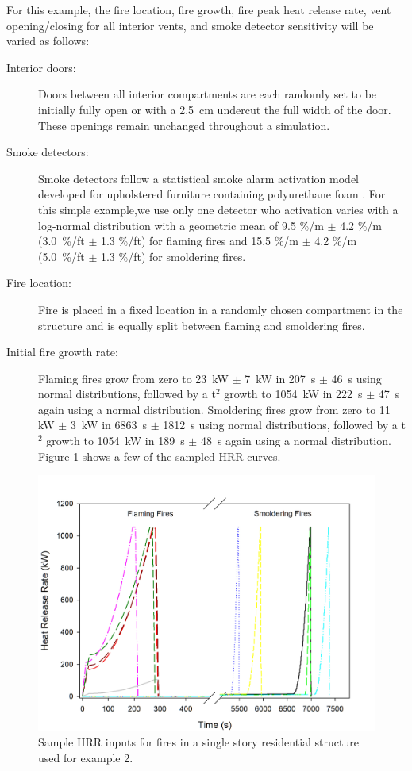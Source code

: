 \documentclass[12pt,twoside]{book}
\begin{document}
For this example, the fire location, fire growth, fire peak heat release rate, vent opening/closing for all interior vents, and smoke detector sensitivity will be varied as follows:

\begin{description}
\item[Interior doors:] Doors between all interior compartments are each randomly set to be initially fully open or with a 2.5~cm undercut the full width of the door. These openings remain unchanged throughout a simulation.
\item[Smoke detectors:] Smoke detectors follow a statistical smoke alarm activation model developed for upholstered furniture containing polyurethane foam \cite{Cleary:2017}. For this simple example,we use only one detector who activation varies with a log-normal distribution with a geometric mean of 9.5 \%/m $\pm$ 4.2 \%/m (3.0~\%/ft $\pm$ 1.3 \%/ft) for flaming fires and 15.5 \%/m $\pm$ 4.2 \%/m (5.0~\%/ft $\pm$ 1.3 \%/ft) for smoldering fires.
    \item[Fire location:] Fire is placed in a fixed location in a randomly chosen compartment in the structure and is equally split between flaming and smoldering fires.
\item[Initial fire growth rate:] Flaming fires grow from zero to 23~kW $\pm$ 7~kW in 207~s $\pm$ 46~s using normal distributions, followed by a t$^2$ growth to 1054~kW in 222~s $\pm$ 47~s again using a normal distribution. Smoldering fires grow from zero to 11~ kW $\pm$ 3~kW in 6863~s $\pm$ 1812~s using normal distributions, followed by a t$^2$ growth to 1054~kW in 189~s $\pm$ 48~s again using a normal distribution. Figure \ref{detector_fires} shows a few of the sampled HRR curves.
\end{description}

\begin{figure}[h!]
\centering
\includegraphics[width=4.5in]{FIGURES/Detector_HRR_Samples.jpg}
\caption{Sample HRR inputs for fires in a single story residential structure used for example 2.}
\label{detector_fires}
\end{figure}
\end{document}
